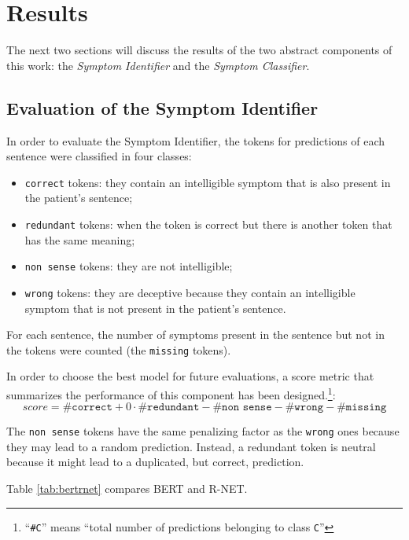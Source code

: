 \chapter{Results}
\label{cha:results}
The next two sections will discuss the results of the two abstract components of this work: the \textit{Symptom Identifier} and the \textit{Symptom Classifier}.

\section{Evaluation of the Symptom Identifier}
\label{sec:eval_symptom_identifier}
In order to evaluate the Symptom Identifier, the tokens for predictions of each sentence were classified in four classes:
\begin{itemize}
  \item \texttt{correct} tokens: they contain an intelligible symptom that is also present in the patient's sentence;
  \item \texttt{redundant} tokens: when the token is correct but there is another token that has the same meaning;
  \item \texttt{non sense} tokens: they are not intelligible;
  \item \texttt{wrong} tokens: they are deceptive because they contain an intelligible symptom that is not present in the patient's sentence.
\end{itemize}

For each sentence, the number of symptoms present in the sentence but not in the tokens were counted (the \texttt{missing} tokens).

In order to choose the best model for future evaluations, a score metric that summarizes the performance of this component has been designed.\footnote{``\texttt{\#C}'' means ``total number of predictions belonging to class \texttt{C}''}:
\begin{equation}
score = \texttt{\#correct} + 0 \cdot \texttt{\#redundant} - \texttt{\#non sense} - \texttt{\#wrong} - \texttt{\#missing}
\end{equation}

The \texttt{non sense} tokens have the same penalizing factor as the \texttt{wrong} ones because they may lead to a random prediction. Instead, a redundant token is neutral because it might lead to a duplicated, but correct, prediction.

Table \ref{tab:bertrnet} compares BERT and R-NET.



